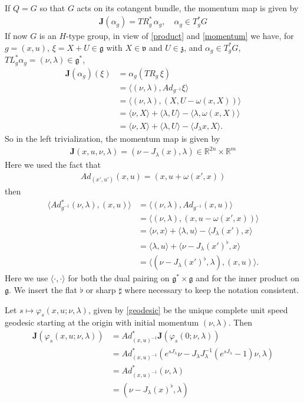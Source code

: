 \documentclass[11pt]{amsart}
\theoremstyle{plain}
\theoremstyle{definition}
\theoremstyle{remark}
\numberwithin{equation}{section}
\def\fz{\mathfrak{z}}
\def\fg{\mathfrak{g}}
\def\fv{\mathfrak{v}}
\numberwithin{equation}{section}
\begin{document}
If $Q=G$ so that $G$ acts on its cotangent bundle, the momentum map is given by
\begin{align}
	\mathbf{J}(\alpha_g)=TR_{g}^*\,\alpha_g, \quad \alpha_g\in T_g^*G \label{momentum}
\end{align}
If now $G$ is an $H$-type group, in view of \eqref{product} and \eqref{momentum} we have, for $g=(x, u)$, $\xi=X+U\in \fg$ with $X\in \fv$ and $U\in \fz$, and $\alpha_g\in T_g^*G$, $TL^*_g\alpha_g=(\nu, \lambda)\in \fg^*$,
\begin{align*}
	\mathbf{J}(\alpha_g)(\xi)
	&=\alpha_g(TR_g\,  \xi)\\
	&=\langle (\nu, \lambda), Ad_{g^{-1}}\xi\rangle\\
	&=\langle (\nu, \lambda), (X, U-\omega(x, X))\rangle\\
	&=\langle \nu, X\rangle +\langle \lambda, U\rangle-\langle \lambda, \omega(x,  X)\rangle\\
	&=\langle \nu, X\rangle+\langle \lambda, U\rangle-\langle J_\lambda x, X\rangle.
\end{align*}
So in the left trivialization, the momentum map is given by
	\begin{align*}
		\mathbf{J}(x, u, \nu, \lambda)=(\nu-J_\lambda(x), \lambda)\in\mathbb{R}^{2n}\times\mathbb{R}^m
	\end{align*}
Here we used the fact that 
\begin{align*}
	Ad_{(x', u')}(x, u)=(x, u+\omega(x', x))
\end{align*}
then 
\begin{align*}
	\langle Ad^*_{g^{-1}}(\nu, \lambda), (x, u)\rangle 
	&=\langle (\nu, \lambda), Ad_{g^{-1}}(x, u)\rangle\\
	&=\langle (\nu, \lambda), (x, u-\omega(x', x))\rangle\\
	&=\langle \nu, x\rangle+\langle \lambda, u\rangle -\langle J_\lambda(x'), x\rangle\\
	&=\langle \lambda, u\rangle+\langle \nu-J_\lambda(x')^\flat, x\rangle\\
	&=\langle (\nu-J_\lambda(x')^\flat, \lambda), (x, u)\rangle.
\end{align*}
Here we use $\langle\cdot, \cdot\rangle$ for both the dual pairing on $\fg^*\times\fg$ and for the inner product on $\fg$. We insert the flat $\flat$ or sharp $\sharp$ where necessary to keep the notation consistent. 

Let $s\mapsto \varphi_s(x, u; \nu, \lambda)$, given by \eqref{geodesic} be the unique complete unit speed geodesic starting at the origin with initial momentum $(\nu, \lambda)$. Then 
\begin{align*}
	\mathbf{J}(\varphi_s(x, u; \nu, \lambda))
	&=Ad^*_{(x, u)^{-1}}\mathbf{J}(\varphi_s(0; \nu, \lambda))\\
	&=Ad^*_{(x, u)^{-1}}(e^{sJ_\lambda}\nu-J_\lambda J_\lambda^{-1}\left(e^{sJ_\lambda}-1\right)\nu, \lambda)\\
	&=Ad^*_{(x, u)^{-1}}(\nu, \lambda)\\
	&=(\nu-J_\lambda(x)^\flat, \lambda)
\end{align*} 
\end{document}
